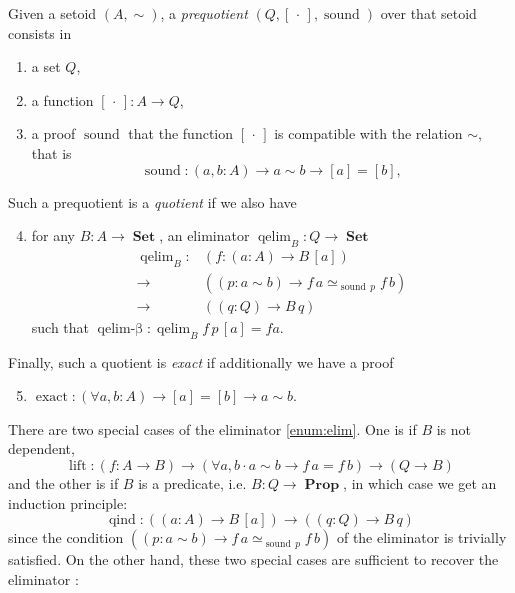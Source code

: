 \documentclass[envcountsame]{llncs}
\newcommand{\dotph}{\,\cdot\,} %
\providecommand{\class}[1]{[#1]}
\DeclareMathOperator{\Prop}{\mathbf{Prop}}
\DeclareMathOperator{\Set}{\mathbf{Set}}
\DeclareMathOperator{\sound}{sound}
\DeclareMathOperator{\qelimbeta}{qelim-\beta}
\DeclareMathOperator{\qind}{qind}
\DeclareMathOperator{\exact}{exact}
\DeclareMathOperator{\qelim}{qelim}
\DeclareMathOperator{\lift}{lift}
\renewcommand{\equiv}{=}
\begin{document}
\begin{definition}
\label{def:quotient}

\noindent
Given a setoid $(A,\sim)$,  a \emph{prequotient} $(Q,\class\dotph,\sound)$ over that setoid consists in
\begin{enumerate}
\item \label{enum:Q} a set $Q$,
\item \label{enum:box}a function $\class\dotph\colon A \to Q$,
\item \label{enum:sound} a proof $\sound$ that  the function $\class\dotph$ is compatible with the relation $\sim$,
that is \[\sound\colon (a,b : A) \to a\sim b \to [a] = [b],\]
\end{enumerate}
Such a prequotient is a \emph{quotient} if  we also have\begin{enumerate}
\setcounter{enumi}{3}
\item \label{enum:elim}
for any $B\colon A\to\Set$, an eliminator $\qelim_B: Q\to\Set$
 \begin{align*}
 \qelim_B\colon &(f\colon (a:A) \to B\,\class a) \\
        {\to}\, &((p:a\sim b) \to f\,a \simeq_{\sound\,p}f\,b)\\
        {\to}\, &((q:Q) \to B\,q)
 \end{align*}
such that $\qelimbeta\colon \qelim_B f \,p\,\class a\equiv f a$.

\end{enumerate}
Finally, such a quotient is \emph{exact} if additionally
we have
a proof\begin{enumerate}
\setcounter{enumi}{4}
\item $\exact :(\forall a,b : A) \to  \class a \equiv \class b \to a \sim b$.

\end{enumerate}
\end{definition}

There are two special cases of the eliminator \ref{enum:elim}. One is if $B$ is not dependent,
 \[\lift\colon (f\colon A \to B) \to (\forall a,b\cdot a\sim b \to f\,a \equiv f\,b) \to (Q \to B)\]
and the other is if $B$ is a predicate, i.e. $B : Q\to \Prop$, in which case we get an induction principle:
\[\qind \colon((a\colon A)\to B \,\class a)\to ((q\colon Q)\to B\,q)\]
since the condition $((p:a\sim b) \to f\,a \simeq_{\sound\,p}f\,b) $  of  the eliminator is trivially satisfied.
On the other hand, these two special cases are sufficient to recover the eliminator :
\end{document}
